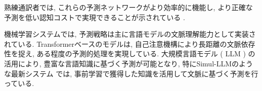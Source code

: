 熟練通訳者では, これらの予測ネットワークがより効率的に機能し, より正確な予測を低い認知コストで実現できることが示されている \cite{yagura2021selective}.

機械学習システムでは, 予測戦略は主に言語モデルの文脈理解能力として実装されている.
Transformerベースのモデルは, 自己注意機構により長距離の文脈依存性を捉え, ある程度の予測的処理を実現している.
大規模言語モデル ( LLM ) の活用により, 豊富な言語知識に基づく予測が可能となり, 特にSimul-LLMのような最新システム \cite{agostinelli2024simulllm} では, 事前学習で獲得した知識を活用して文脈に基づく予測を行っている.